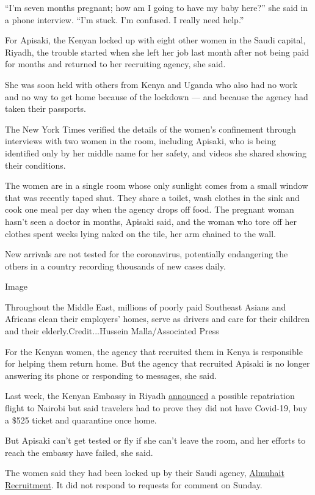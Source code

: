 ``I'm seven months pregnant; how am I going to have my baby here?'' she
said in a phone interview. ``I'm stuck. I'm confused. I really need
help.''

For Apisaki, the Kenyan locked up with eight other women in the Saudi
capital, Riyadh, the trouble started when she left her job last month
after not being paid for months and returned to her recruiting agency,
she said.

She was soon held with others from Kenya and Uganda who also had no work
and no way to get home because of the lockdown --- and because the
agency had taken their passports.

The New York Times verified the details of the women's confinement
through interviews with two women in the room, including Apisaki, who is
being identified only by her middle name for her safety, and videos she
shared showing their conditions.

The women are in a single room whose only sunlight comes from a small
window that was recently taped shut. They share a toilet, wash clothes
in the sink and cook one meal per day when the agency drops off food.
The pregnant woman hasn't seen a doctor in months, Apisaki said, and the
woman who tore off her clothes spent weeks lying naked on the tile, her
arm chained to the wall.

New arrivals are not tested for the coronavirus, potentially endangering
the others in a country recording thousands of new cases daily.

Image

Throughout the Middle East, millions of poorly paid Southeast Asians and
Africans clean their employers' homes, serve as drivers and care for
their children and their elderly.Credit...Hussein Malla/Associated Press

For the Kenyan women, the agency that recruited them in Kenya is
responsible for helping them return home. But the agency that recruited
Apisaki is no longer answering its phone or responding to messages, she
said.

Last week, the Kenyan Embassy in Riyadh
\href{https://twitter.com/KenyaRiyadh/status/1277911187724828673}{announced}
a possible repatriation flight to Nairobi but said travelers had to
prove they did not have Covid-19, buy a \$525 ticket and quarantine once
home.

But Apisaki can't get tested or fly if she can't leave the room, and her
efforts to reach the embassy have failed, she said.

The women said they had been locked up by their Saudi agency,
\href{https://www.facebookcorewwwi.onion/\%D9\%85\%D9\%83\%D8\%AA\%D8\%A8-\%D8\%A7\%D9\%84\%D9\%85\%D8\%AD\%D9\%8A\%D8\%B7-\%D9\%84\%D9\%84\%D8\%A7\%D8\%B3\%D8\%AA\%D9\%82\%D8\%AF\%D8\%A7\%D9\%85-103491741091774/?ref=nf\&hc_ref=ARSq4vc8q4S5QfycNQXadsjq_HLexcYyzaiFQZAKq_cXIDFfzK1uEecA1F1fnZyolcM}{Almuhait
Recruitment}. It did not respond to requests for comment on Sunday.

